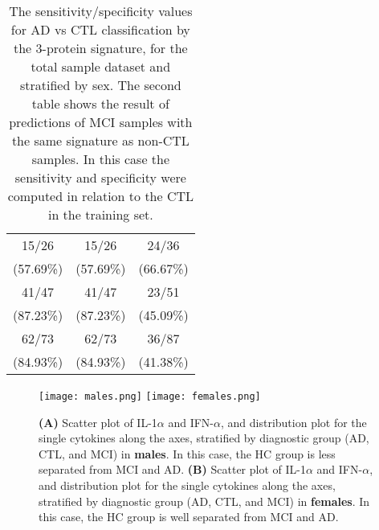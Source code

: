 \documentclass{standalone}
\begin{document}
\begin{table}[!htb]
\begin{minipage}{.5\linewidth}
\begin{tabular}{ccc}
          \hline
                           15/26            &   15/26                &   24/36               \\
                                 (57.69\%)  &         (57.69\%)      &         (66.67\%)     \\
                           41/47            &   41/47                &   23/51               \\
                                 (87.23\%)  &         (87.23\%)      &         (45.09\%)     \\
                           62/73            &   62/73                &   36/87               \\
                                 (84.93\%)  &         (84.93\%)      &         (41.38\%)     \\
          \hline
      \end{tabular}
  \end{minipage}
  \caption{The sensitivity/specificity values for AD vs CTL classification by the 3-protein signature, for the total sample dataset and stratified by sex.
    The second table shows the result of predictions of MCI samples with the same signature as non-CTL samples.
    In this case the sensitivity and specificity were computed in relation to the CTL in the training set.
  }
  \label{tab:cytokine}
\end{table}


\begin{figure}[htbp]
\hspace{-1.0cm}
\texttt{[image: males.png]}
\qquad\qquad
\hspace{1.0cm}
\texttt{[image: females.png]}
\caption{\textbf{(A)} Scatter plot of IL-1$\alpha$ and IFN-$\alpha$, and distribution plot for the single cytokines along the axes, stratified by diagnostic group (AD, CTL, and MCI) in \textbf{males}.
In this case, the HC group is less separated from MCI and AD.
\textbf{(B)} Scatter plot of IL-1$\alpha$ and IFN-$\alpha$, and distribution plot for the single cytokines along the axes, stratified by diagnostic group (AD, CTL, and MCI) in \textbf{females}.
In this case, the HC group is well separated from MCI and AD.
}
\label{fig:cytokine_sex}
\end{figure}
\end{document}
